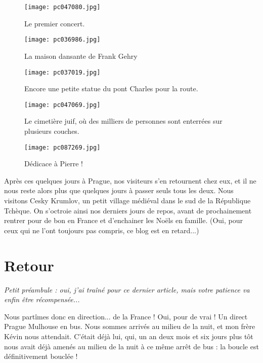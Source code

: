 \documentclass{book}
\begin{document}
\begin{figure}[h]
\centering
\texttt{[image: pc047080.jpg]}
\caption*{Le premier concert.}
\end{figure}
\begin{figure}[h]
\centering
\texttt{[image: pc036986.jpg]}
\caption*{La maison dansante de Frank Gehry}
\end{figure}


\begin{figure}[h]
\centering
\texttt{[image: pc037019.jpg]}
\caption*{Encore une petite statue du pont Charles pour la route.}
\end{figure}


\begin{figure}[h]
\centering
\texttt{[image: pc047069.jpg]}
\caption*{Le cimetière juif, où des milliers de personnes sont enterrées sur plusieurs couches.}
\end{figure}


\begin{figure}[h]
\centering
\texttt{[image: pc087269.jpg]}
\caption*{Dédicace à Pierre !}
\end{figure}

Après ces quelques jours à Prague, nos visiteurs s'en retournent chez eux, et il ne nous reste alors plus que quelques jours à passer seuls tous les deux. Nous visitons Cesky Krumlov, un petit village médiéval dans le sud de la République Tchèque. On s'octroie ainsi nos derniers jours de repos, avant de prochainement rentrer pour de bon en France et d'enchainer les Noëls en famille. (Oui, pour ceux qui ne l'ont toujours pas compris, ce blog est en retard...)




\chapter{Retour}
\emph{Petit préambule : oui, j'ai traîné pour ce dernier article, mais votre patience va enfin être récompensée...}

Nous partîmes donc en direction... de la France ! Oui, pour de vrai ! Un direct Prague Mulhouse en bus. Nous sommes arrivés au milieu de la nuit, et mon frère Kévin nous attendait. C'était déjà lui, qui, un an deux mois et six jours plus tôt nous avait déjà amenés au milieu de la nuit à ce même arrêt de bus : la boucle est définitivement bouclée !
\end{document}
